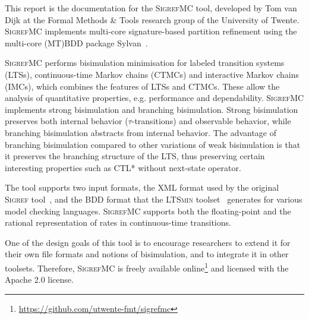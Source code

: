 
This report is the documentation for the \textsc{SigrefMC} tool, developed by Tom van Dijk at the Formal Methods \& Tools research group of the University of Twente.
%
%
\textsc{SigrefMC} implements multi-core signature-based partition refinement using the multi-core (MT)BDD package Sylvan~\cite{DBLP:conf/tacas/DijkP15}.


\textsc{SigrefMC} performs bisimulation minimisation for labeled transition systems (LTSs), continuous-time Markov chains (CTMCs) and interactive Markov chains (IMCs), which combines the features of LTSs and CTMCs.
These allow the analysis of quantitative properties, e.g. performance and dependability.
%
%
\textsc{SigrefMC} implements strong bisimulation and branching bisimulation. Strong bisimulation preserves both internal behavior ($\tau$-transitions) and observable behavior, while branching bisimulation abstracts from internal behavior. The advantage of branching bisimulation compared to other variations of weak bisimulation is that it preserves the branching structure of the LTS, thus preserving certain interesting properties such as CTL* without next-state operator.




The tool supports two input formats, the XML format used by the original \textsc{Sigref} tool~\cite{DBLP:conf/atva/WimmerHHSB06}, and the BDD format that the \textsc{LTSmin} toolset~\cite{DBLP:conf/tacas/KantLMPBD15} generates for various model checking languages.
%
%
\textsc{SigrefMC} supports both the floating-point and the rational representation of rates in continuous-time transitions.




One of the design goals of this tool is to encourage researchers to extend it for their own file formats and notions of bisimulation, and to integrate it in other toolsets.
%
%
Therefore, \textsc{SigrefMC} is freely available online\footnote{\url{https://github.com/utwente-fmt/sigrefmc}} and licensed with the Apache 2.0 license.



